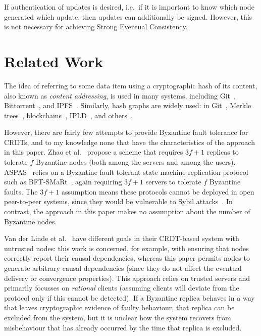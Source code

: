 \documentclass[sigplan,review]{acmart}
\begin{document}
If authentication of updates is desired, i.e.\ if it is important to know which node generated which update, then updates can additionally be signed.
However, this is not necessary for achieving Strong Eventual Consistency.

\section{Related Work}\label{sec:relwork}

The idea of referring to some data item using a cryptographic hash of its content, also known as \emph{content addressing}, is used in many systems, including Git~\cite{ProGit}, Bittorrent~\cite{Pouwelse:2005}, and IPFS~\cite{Benet:2014}.
Similarly, hash graphs are widely used: in Git~\cite{ProGit}, Merkle trees~\cite{Merkle:1987}, blockchains~\cite{Baird:2016tq}, IPLD~\cite{IPLD}, and others~\cite{Kang:2003}.

However, there are fairly few attempts to provide Byzantine fault tolerance for CRDTs, and to my knowledge none that have the characteristics of the approach in this paper.
Zhao et al.~\cite{Zhao:2013ie,Zhao:2016,Chai:2014} propose a scheme that requires $3f+1$ replicas to tolerate $f$ Byzantine nodes (both among the servers and among the users).
ASPAS~\cite{Yactine:2021,Shoker:2017} relies on a Byzantine fault tolerant state machine replication protocol such as BFT-SMaRt~\cite{Bessani:2014}, again requiring $3f+1$ servers to tolerate $f$ Byzantine faults.
The $3f+1$ assumption means these protocols cannot be deployed in open peer-to-peer systems, since they would be vulnerable to Sybil attacks~\cite{Douceur:2002}.
In contrast, the approach in this paper makes no assumption about the number of Byzantine nodes.

Van der Linde et al.~\cite{vanderLinde:2020} have different goals in their CRDT-based system with untrusted nodes: this work is concerned, for example, with ensuring that nodes correctly report their causal dependencies, whereas this paper permits nodes to generate arbitrary causal dependencies (since they do not affect the eventual delivery or convergence properties).
This approach relies on trusted servers and primarily focusses on \emph{rational} clients (assuming clients will deviate from the protocol only if this cannot be detected).
If a Byzantine replica behaves in a way that leaves cryptographic evidence of faulty behaviour, that replica can be excluded from the system, but it is unclear how the system recovers from misbehaviour that has already occurred by the time that replica is excluded.
\end{document}
